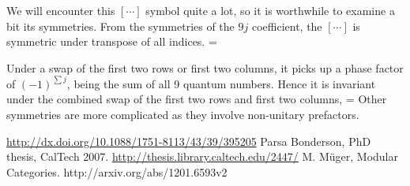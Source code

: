 \documentclass[12pt]{article}
\begin{document}
We will encounter this $[\cdots]$ symbol quite a lot, so it is worthwhile to examine a bit its symmetries.
From the symmetries of the $9j$ coefficient, the $[\cdots]$ is symmetric under transpose of all indices.
\beq
{}
=
\eeq

Under a swap of the first two rows or first two columns, it picks up a phase factor of $(-1)^{\sum j}$,
being the sum of all 9 quantum numbers. Hence it is invariant under the combined swap of the first two
rows and first two columns,
\beq
{}
=
\eeq
Other symmetries are more complicated as they involve non-unitary prefactors.

\begin{thebibliography}{99}
 \url{http://dx.doi.org/10.1088/1751-8113/43/39/395205}
 Parsa Bonderson, PhD thesis, CalTech 2007.  \url{http://thesis.library.caltech.edu/2447/}
 M. M\"uger, Modular Categories.  http://arxiv.org/abs/1201.6593v2
\end{thebibliography}
\end{document}
